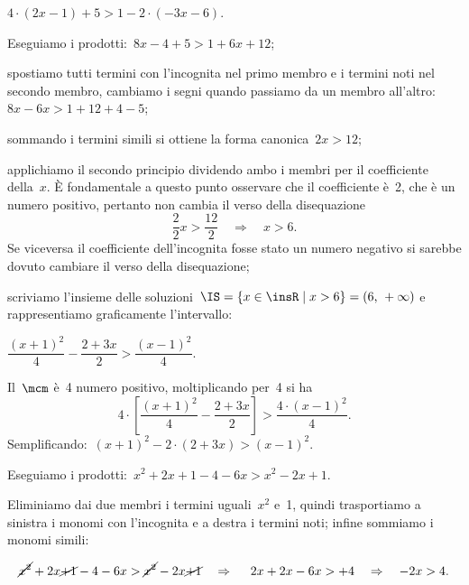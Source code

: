 \begin{exrig}
 \begin{esempio}
$4\cdot (2x-1)+5>1-2\cdot (-3x-6)$.

\begin{enumeratea}
\item Eseguiamo i prodotti:~$8x-4+5>1+6x+12$;

\item spostiamo tutti termini con
l'incognita nel primo membro e i termini noti nel
secondo membro, cambiamo i segni quando passiamo da un membro
all'altro:~$8x-6x>1+12+4-5$;

\item sommando i termini simili si ottiene la forma
canonica~$2x>12$;

\item applichiamo il secondo principio dividendo ambo i
membri per il coefficiente della~$x$. È fondamentale a
questo punto osservare che il coefficiente è~2, che è un numero
positivo, pertanto non cambia il verso della disequazione
\[\frac{2}{2}x>\frac{12}{2}\quad\Rightarrow\quad x>6.\]
Se viceversa il
coefficiente dell'incognita fosse stato un numero
negativo si sarebbe dovuto cambiare il verso della disequazione;

\item scriviamo l'insieme delle
soluzioni~$\IS=\{x\in\insR\mid x>6\}=(6\text{,~}+\infty )$ e rappresentiamo
graficamente l'intervallo:
\begin{center}
 
\end{center}
\end{enumeratea}
 \end{esempio}

 \begin{esempio}
 $\dfrac{(x+1)^{2}}{4}-\dfrac{2+3x}{2}>\dfrac{(x-1)^{2}}{4}.$
\end{esempio}
Il~$\mcm$ è~4 numero positivo, moltiplicando per~4 si ha
\[4\cdot\left[\frac{(x+1)^{2}}{4}-\frac{2+3x}{2}\right]>\frac{4\cdot{(x-1)^{2}}}{4}.\]
Semplificando:~$(x+1)^{2}-2\cdot (2+3x)>(x-1)^{2}$.

Eseguiamo i prodotti:~$x^{2}+2x+1-4-6x>x^{2}-2x+1$.

Eliminiamo dai due membri i termini uguali~$x^{2}$ e~1,
quindi trasportiamo a sinistra i monomi con l'incognita e a
destra i termini noti; infine sommiamo i monomi simili:

\[\cancel{{x^{2}}}+2x\cancel{+1}-4-6x>\cancel{{x^{2}}}-2x\cancel{+1}\quad \Rightarrow\quad~2x+2x-6x>+4
\quad\Rightarrow\quad -2x>4.\]


\end{exrig}
